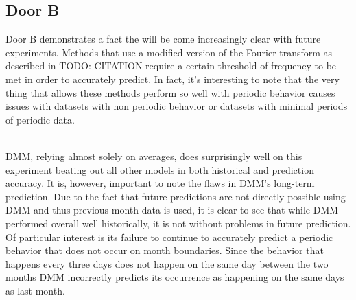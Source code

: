 \subsection { Door B }

Door B demonstrates a fact the will be come increasingly clear with future
experiments.  Methods that use a modified version of the Fourier transform as
described in TODO: CITATION require a certain threshold of frequency to be met
in order to accurately predict.  In fact, it's interesting to note that the
very thing that allows these methods perform so well with periodic behavior
causes issues with datasets with non periodic behavior or datasets with
minimal periods of periodic data. \\

\begin{table}[h!]
  \centering
  \caption{Door B Data Overview}
\end{table} \\

DMM, relying almost solely on averages, does surprisingly well on this
experiment beating out all other models in both historical and prediction
accuracy.  It is, however, important to note the flaws in DMM's long-term
prediction. Due to the fact that future predictions are not directly possible
using DMM and thus previous month data is used, it is clear to see that
while DMM performed overall well historically, it is not without problems
in future prediction.  Of particular interest is its failure to continue to
accurately predict a periodic behavior that does not occur on month
boundaries. Since the behavior that happens every three days does not happen
on the same day between the two months DMM incorrectly predicts its
occurrence as happening on the same days as last month.

